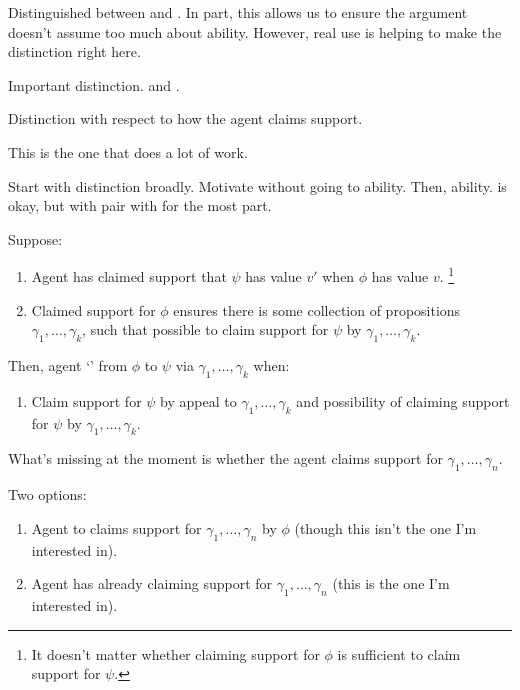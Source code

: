 \begin{note}
  Distinguished between \AR{} and \WR{}.
  In part, this allows us to ensure the argument doesn't assume too much about ability.
  However, real use is helping to make the distinction right here.

  Important distinction.
  \adS{} and \adC{}.

  Distinction with respect to how the agent claims support.

  This is the one that does a lot of work.

  Start with distinction broadly.
  Motivate without going to ability.
  Then, ability.
  \adS{} is okay, but with \adC{} pair with \WR{} for the most part.
\end{note}

\begin{note}
  \begin{definition}[Interpolation]
    Suppose:
    \begin{enumerate}
    \item Agent has claimed support that \(\psi\) has value \(v'\) when \(\phi\) has value \(v\).\nolinebreak
      \footnote{
        It doesn't matter whether claiming support for \(\phi\) is sufficient to claim support for \(\psi\).
      }
    \item Claimed support for \(\phi\) ensures there is some collection of propositions \(\gamma_{1},\dots,\gamma_{k}\), such that possible to claim support for \(\psi\) by \(\gamma_{1},\dots,\gamma_{k}\).
    \end{enumerate}
    Then, agent `\adC{}' from \(\phi\) to \(\psi\) via \(\gamma_{1},\dots,\gamma_{k}\) when:
    \begin{enumerate}
    \item Claim support for \(\psi\) by appeal to \(\gamma_{1},\dots,\gamma_{k}\) and possibility of claiming support for \(\psi\) by \(\gamma_{1},\dots,\gamma_{k}\).
    \end{enumerate}
  \end{definition}
  {
    \color{red}
    What's missing at the moment is whether the agent claims support for \(\gamma_{1},\dots,\gamma_{n}\).

    Two options:

    \begin{enumerate}
    \item Agent to claims support for \(\gamma_{1},\dots,\gamma_{n}\) by \(\phi\) (though this isn't the one I'm interested in).
    \item Agent has already claiming support for \(\gamma_{1},\dots,\gamma_{n}\) (this is the one I'm interested in).
    \end{enumerate}

}
\end{note}
